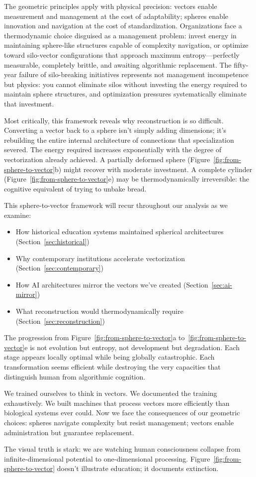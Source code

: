 The geometric principles apply with physical precision: vectors enable measurement and management at the cost of adaptability; spheres enable innovation and navigation at the cost of standardization. Organizations face a thermodynamic choice disguised as a management problem: invest energy in maintaining sphere-like structures capable of complexity navigation, or optimize toward silo-vector configurations that approach maximum entropy---perfectly measurable, completely brittle, and awaiting algorithmic replacement. The fifty-year failure of silo-breaking initiatives \citep{ashkenas2015} represents not management incompetence but physics: you cannot eliminate silos without investing the energy required to maintain sphere structures, and optimization pressures systematically eliminate that investment.

Most critically, this framework reveals why reconstruction is so difficult. Converting a vector back to a sphere isn't simply adding dimensions; it's rebuilding the entire internal architecture of connections that specialization severed. The energy required increases exponentially with the degree of vectorization already achieved. A partially deformed sphere (Figure~\ref{fig:from-sphere-to-vector}b) might recover with moderate investment. A complete cylinder (Figure~\ref{fig:from-sphere-to-vector}e) may be thermodynamically irreversible: the cognitive equivalent of trying to unbake bread.

This sphere-to-vector framework will recur throughout our analysis as we examine:
\begin{itemize}
\item How historical education systems maintained spherical architectures (Section~\ref{sec:historical})
\item Why contemporary institutions accelerate vectorization (Section~\ref{sec:contemporary})
\item How AI architectures mirror the vectors we've created (Section~\ref{sec:ai-mirror})
\item What reconstruction would thermodynamically require (Section~\ref{sec:reconstruction})
\end{itemize}

The progression from Figure~\ref{fig:from-sphere-to-vector}a to~\ref{fig:from-sphere-to-vector}e is not evolution but entropy, not development but degradation. Each stage appears locally optimal while being globally catastrophic. Each transformation seems efficient while destroying the very capacities that distinguish human from algorithmic cognition.

We trained ourselves to think in vectors. We documented the training exhaustively. We built machines that process vectors more efficiently than biological systems ever could. Now we face the consequences of our geometric choices: spheres navigate complexity but resist management; vectors enable administration but guarantee replacement.

The visual truth is stark: we are watching human consciousness collapse from infinite-dimensional potential to one-dimensional processing. Figure~\ref{fig:from-sphere-to-vector} doesn't illustrate education; it documents extinction.